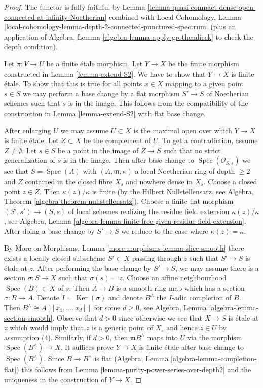 \documentclass[10pt,a4paper]{amsart}
\theoremstyle{plain}
\theoremstyle{definition}
\theoremstyle{remark}
\numberwithin{equation}{subsection}
\def\Spec{\mathop{\mathrm{Spec}}}
\def\Ker{\mathop{\mathrm{Ker}}}
\begin{document}
\begin{proof}
The functor is fully faithful by
Lemma \ref{lemma-quasi-compact-dense-open-connected-at-infinity-Noetherian}
combined with Local Cohomology,
Lemma \ref{local-cohomology-lemma-depth-2-connected-punctured-spectrum}
(plus an application of
Algebra, Lemma \ref{algebra-lemma-apply-grothendieck}
to check the depth condition).

\medskip\noindent
Let $\pi : V \to U$ be a finite \'etale morphism. Let $Y \to X$
be the finite morphism constructed in Lemma \ref{lemma-extend-S2}.
We have to show that $Y \to X$ is finite \'etale.
To show that this is true for all points $x \in X$ mapping to a
given point $s \in S$ we may perform a base change by a flat
morphism $S' \to S$ of Noetherian schemes such that $s$ is
in the image. This follows from the compatibility of the
construction in Lemma \ref{lemma-extend-S2} with flat base change.

\medskip\noindent
After enlarging $U$ we may assume $U \subset X$ is
the maximal open over which $Y \to X$ is finite \'etale.
Let $Z \subset X$ be the complement of $U$.
To get a contradiction, assume $Z \not = \emptyset$.
Let $s \in S$ be a point in the image of $Z \to S$
such that no strict generalization of $s$ is in the image.
Then after base change to $\Spec(\mathcal{O}_{S, s})$
we see that $S = \Spec(A)$ with $(A, \mathfrak m, \kappa)$
a local Noetherian ring of depth $\geq 2$ and $Z$
contained in the closed fibre $X_s$
and nowhere dense in $X_s$. Choose a closed point $z \in Z$.
Then $\kappa(z)/\kappa$ is finite (by the Hilbert Nullstellensatz, see
Algebra, Theorem \ref{algebra-theorem-nullstellensatz}).
Choose a finite flat morphism $(S', s') \to (S, s)$ of local schemes
realizing the residue field extension $\kappa(z)/\kappa$, see
Algebra, Lemma \ref{algebra-lemma-finite-free-given-residue-field-extension}.
After doing a base change by $S' \to S$ we reduce to the case
where $\kappa(z) = \kappa$.

\medskip\noindent
By More on Morphisms, Lemma \ref{more-morphisms-lemma-slice-smooth}
there exists a locally closed subscheme $S' \subset X$ passing through $z$
such that $S' \to S$ is \'etale at $z$. After performing the base change
by $S' \to S$, we may assume there is a section $\sigma : S \to X$
such that $\sigma(s) = z$. Choose an affine neighbourhood
$\Spec(B) \subset X$ of $s$. Then $A \to B$ is a smooth ring
map which has a section $\sigma : B \to A$. Denote $I = \Ker(\sigma)$
and denote $B^\wedge$ the $I$-adic completion of $B$.
Then $B^\wedge \cong A[[x_1, \ldots, x_d]]$ for some $d \geq 0$, see
Algebra, Lemma \ref{algebra-lemma-section-smooth}.
Observe that $d > 0$ since otherwise we see that $X \to S$
is \'etale at $z$ which would imply that $z$ is a generic point of
$X_s$ and hence $z \in U$ by assumption (4).
Similarly, if $d > 0$, then $\mathfrak m B^\wedge$ maps into
$U$ via the morphism $\Spec(B^\wedge) \to X$.
It suffices prove $Y \to X$ is finite \'etale after base change
to $\Spec(B^\wedge)$. Since $B \to B^\wedge$ is flat
(Algebra, Lemma \ref{algebra-lemma-completion-flat})
this follows from Lemma \ref{lemma-purity-power-series-over-depth2}
and the uniqueness in the construction of $Y \to X$.
\end{proof}
\end{document}
